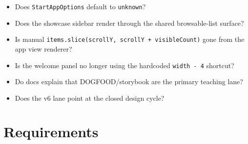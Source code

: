 \begin{itemize}
\tightlist
\item
  Does \texttt{S\allowbreak{}t\allowbreak{}a\allowbreak{}r\allowbreak{}t\allowbreak{}A\allowbreak{}p\allowbreak{}p\allowbreak{}O\allowbreak{}p\allowbreak{}t\allowbreak{}i\allowbreak{}o\allowbreak{}n\allowbreak{}s} default to \texttt{u\allowbreak{}n\allowbreak{}k\allowbreak{}n\allowbreak{}o\allowbreak{}w\allowbreak{}n}?
\item
  Does the showcase sidebar render through the shared browsable-list surface?
\item
  Is manual \texttt{i\allowbreak{}t\allowbreak{}e\allowbreak{}m\allowbreak{}s\allowbreak{}.\allowbreak{}s\allowbreak{}l\allowbreak{}i\allowbreak{}c\allowbreak{}e\allowbreak{}(\allowbreak{}s\allowbreak{}c\allowbreak{}r\allowbreak{}o\allowbreak{}l\allowbreak{}l\allowbreak{}Y\allowbreak{},\allowbreak{} \allowbreak{}s\allowbreak{}c\allowbreak{}r\allowbreak{}o\allowbreak{}l\allowbreak{}l\allowbreak{}Y\allowbreak{} \allowbreak{}+\allowbreak{} \allowbreak{}v\allowbreak{}i\allowbreak{}s\allowbreak{}i\allowbreak{}b\allowbreak{}l\allowbreak{}e\allowbreak{}C\allowbreak{}o\allowbreak{}u\allowbreak{}n\allowbreak{}t\allowbreak{})} gone from the app view renderer?
\item
  Is the welcome panel no longer using the hardcoded \texttt{w\allowbreak{}i\allowbreak{}d\allowbreak{}t\allowbreak{}h\allowbreak{} \allowbreak{}-\allowbreak{} \allowbreak{}4} shortcut?
\item
  Do docs explain that DOGFOOD/storybook are the primary teaching lane?
\item
  Does the v6 lane point at the closed design cycle?
\end{itemize}

\section{Requirements}\label{record-131-requirements}

